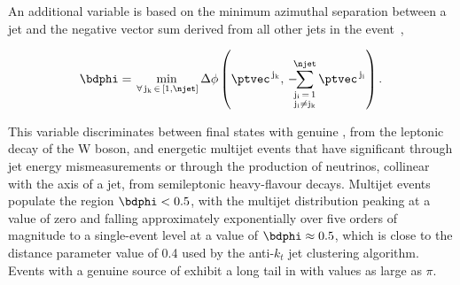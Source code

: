 An additional variable is based on the minimum azimuthal separation
between a jet and the negative vector \ptvec sum derived from all
other jets in the event~\cite{RA1Paper},


\begin{equation}
  \bdphi = \min_{\,\forall\, \mathrm{j_k} \,\in\, [1,\njet]}
  \Delta\phi \left( \ptvec^{\,\mathrm{j_k}}, \,
    -\hspace{-0.5em}\sum_{\substack{\mathrm{j_i}\, =\, 1 \\ \mathrm{j_i} \ne \mathrm{j_k}}}^{\njet}
    \ptvec^{\,\mathrm{j_i}} \right).
  \label{eq:bdphi}
\end{equation}

This variable discriminates between final states with genuine
\ptvecmiss, \eg from the leptonic decay of the W boson, and energetic
multijet events that have significant \ptvecmiss through jet energy
mismeasurements or through the production of neutrinos, collinear with
the axis of a jet, from semileptonic heavy-flavour decays. Multijet
events populate the region $\bdphi < 0.5$, with the multijet
distribution peaking at a value of zero and falling approximately
exponentially over five orders of magnitude to a single-event level at
a value of $\bdphi \approx 0.5$, which is close to the distance
parameter value of 0.4 used by the anti-$k_t$ jet clustering
algorithm. Events with a genuine source of \ptvecmiss exhibit a long
tail in \bdphi with values as large as $\pi$. 




